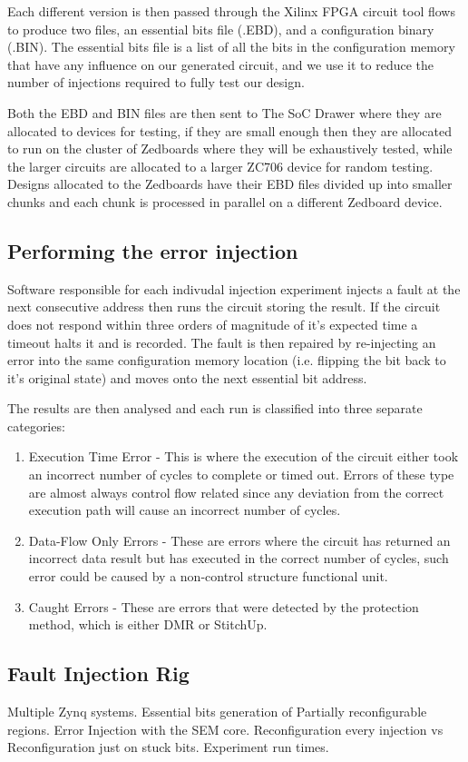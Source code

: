 Each different version is then passed through the Xilinx FPGA circuit tool flows to produce
two files, an essential bits file (.EBD), and a configuration binary (.BIN).
The essential bits file is a list of all the bits in the configuration memory that have any
influence on our generated circuit, and we use it to reduce the number of injections
required to fully test our design.

Both the EBD and BIN files are then sent to The SoC Drawer where they are allocated to
devices for testing, if they are small enough then they are allocated to run on the 
cluster of Zedboards where they will be exhaustively tested, while the larger circuits 
are allocated to a larger ZC706 device for random testing.
Designs allocated to the Zedboards have their EBD files divided up
into smaller chunks and each chunk is processed in parallel on a different Zedboard device.

\subsection{Performing the error injection}
Software responsible for each indivudal injection experiment injects a fault at the 
next consecutive address then runs the circuit storing the result.
If the circuit does not respond within three orders of magnitude of it's expected time
a timeout halts it and is recorded.
The fault is then repaired by re-injecting an error into the
same configuration memory location (i.e. flipping the bit back to it's original state)
and moves onto the next essential bit address.

The results are then analysed and each run is classified into three separate categories:

\begin{enumerate}
\item Execution Time Error - This is where the execution of the circuit either took
an incorrect number of cycles to complete or timed out. Errors of these type are almost
always control flow related since any deviation from the correct execution path will cause
an incorrect number of cycles.
\item Data-Flow Only Errors - These are errors where the circuit has returned an incorrect
data result but has executed in the correct number of cycles, such error could be caused
by a non-control structure functional unit.
\item Caught Errors - These are errors that were detected by the protection method, which is
either DMR or StitchUp.
\end{enumerate}


\subsection{Fault Injection Rig}
Multiple Zynq systems. Essential bits generation of Partially reconfigurable regions.
Error Injection with the SEM core. Reconfiguration every injection vs Reconfiguration just
on stuck bits. Experiment run times.

